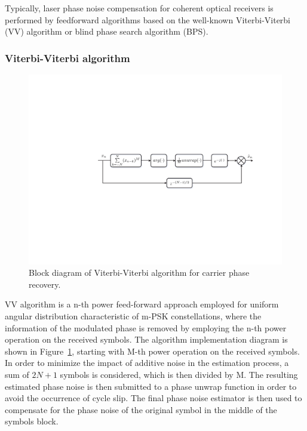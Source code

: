 Typically, laser phase noise compensation for coherent optical receivers is performed by feedforward algorithms based on the well-known Viterbi-Viterbi (VV) algorithm or blind phase search algorithm (BPS). 

\subsubsection{Viterbi-Viterbi algorithm}
\begin{figure}[h!]
    \centering
    \includegraphics[width=\textwidth]{./sdf/dsp_laser_phase_compensation/figures/VV_phaseEstimation.pdf}
    \caption{Block diagram of Viterbi-Viterbi algorithm for carrier phase recovery.}
    \label{fig_VVdiagram}
\end{figure}
VV algorithm is a n-th power feed-forward approach employed for uniform angular distribution characteristic of m-PSK constellations, where the information of the modulated phase is removed by employing the n-th power operation on the received symbols. The algorithm implementation diagram is shown in Figure~\ref{fig_VVdiagram}, starting with M-th power operation on the received symbols. In order to minimize the impact of additive noise in the estimation process, a sum of $2N+1$ symbols is considered, which is then divided by M. The resulting estimated phase noise is then submitted to a phase unwrap function in order to avoid the occurrence of cycle slip. The final phase noise estimator is then used to compensate for the phase noise of the original symbol in the middle of the symbols block.


